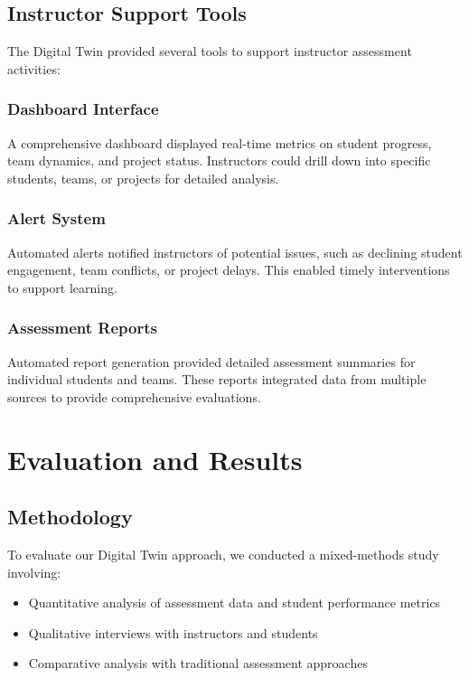 \documentclass[review]{elsarticle}
\begin{document}
\subsection{Instructor Support Tools}
\label{sec:instructor_tools}

The Digital Twin provided several tools to support instructor assessment activities:

\subsubsection{Dashboard Interface}
A comprehensive dashboard displayed real-time metrics on student progress, team dynamics, and project status. Instructors could drill down into specific students, teams, or projects for detailed analysis.

\subsubsection{Alert System}
Automated alerts notified instructors of potential issues, such as declining student engagement, team conflicts, or project delays. This enabled timely interventions to support learning.

\subsubsection{Assessment Reports}
Automated report generation provided detailed assessment summaries for individual students and teams. These reports integrated data from multiple sources to provide comprehensive evaluations.

\section{Evaluation and Results}
\label{sec:evaluation}

\subsection{Methodology}
\label{sec:methodology}

To evaluate our Digital Twin approach, we conducted a mixed-methods study involving:
\begin{itemize}
    \item Quantitative analysis of assessment data and student performance metrics
    \item Qualitative interviews with instructors and students
    \item Comparative analysis with traditional assessment approaches
\end{itemize}
\end{document}
